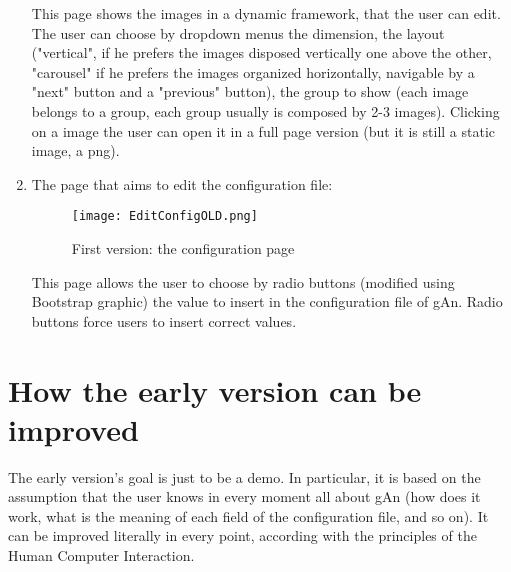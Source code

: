 \begin{enumerate}
This page shows the images in a dynamic framework, that the user can edit.
The user can choose by dropdown menus the dimension, the layout ("vertical", if he prefers the images disposed vertically one above the other, "carousel" if he prefers the images organized horizontally, navigable by a "next" button and a "previous" button), the group to show (each image belongs to a group, each group usually is composed by 2-3 images). Clicking on a image the user can open it in a full page version (but it is still a static image, a png).


\item The page that aims to edit the configuration file:

\begin{figure}[H]
\centering
\texttt{[image: EditConfigOLD.png]}  
\caption{First version: the configuration page}
\end{figure}   

This page allows the user to choose by radio buttons (modified using Bootstrap graphic) the value to insert in the configuration file of gAn. Radio buttons force users to insert correct values.    

\end{enumerate}

\section{How the early version can be improved}
The early version's goal is just to be a demo. In particular, it is based on the assumption that the user knows in every moment all about gAn (how does it work,  what is the meaning of each field of the configuration file, and so on). It can be improved literally in every point, according with the principles of the Human Computer Interaction.

